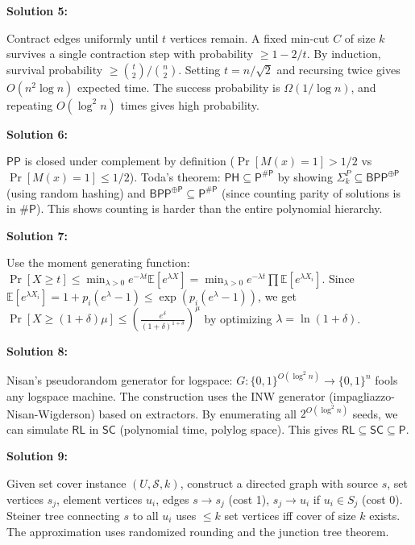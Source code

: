 \documentclass[12pt,a4paper]{exam}
\begin{document}
\textbf{Solution 5:}

Contract edges uniformly until $t$ vertices remain. A fixed min-cut $C$ of size $k$ survives a single contraction step with probability $\geq 1 - 2/t$. By induction, survival probability $\geq \binom{t}{2}/\binom{n}{2}$. Setting $t = n/\sqrt{2}$ and recursing twice gives $O(n^2 \log n)$ expected time. The success probability is $\Omega(1/\log n)$, and repeating $O(\log^2 n)$ times gives high probability.

\vspace{0.5cm}

\textbf{Solution 6:}

$\mathsf{PP}$ is closed under complement by definition ($\Pr[M(x)=1] > 1/2$ vs $\Pr[M(x)=1] \leq 1/2$). Toda's theorem: $\mathsf{PH} \subseteq \mathsf{P}^{\#\mathsf{P}}$ by showing $\Sigma_k^P \subseteq \mathsf{BPP}^{\oplus\mathsf{P}}$ (using random hashing) and $\mathsf{BPP}^{\oplus\mathsf{P}} \subseteq \mathsf{P}^{\#\mathsf{P}}$ (since counting parity of solutions is in $\#\mathsf{P}$). This shows counting is harder than the entire polynomial hierarchy.

\vspace{0.5cm}

\textbf{Solution 7:}

Use the moment generating function: $\Pr[X \geq t] \leq \min_{\lambda > 0} e^{-\lambda t} \mathbb{E}[e^{\lambda X}] = \min_{\lambda > 0} e^{-\lambda t} \prod \mathbb{E}[e^{\lambda X_i}]$. Since $\mathbb{E}[e^{\lambda X_i}] = 1 + p_i(e^\lambda - 1) \leq \exp(p_i(e^\lambda - 1))$, we get $\Pr[X \geq (1+\delta)\mu] \leq (\frac{e^\delta}{(1+\delta)^{1+\delta}})^\mu$ by optimizing $\lambda = \ln(1+\delta)$.

\vspace{0.5cm}

\textbf{Solution 8:}

Nisan's pseudorandom generator for logspace: $G: \{0,1\}^{O(\log^2 n)} \to \{0,1\}^{n}$ fools any logspace machine. The construction uses the INW generator (impagliazzo-Nisan-Wigderson) based on extractors. By enumerating all $2^{O(\log^2 n)}$ seeds, we can simulate $\mathsf{RL}$ in $\mathsf{SC}$ (polynomial time, polylog space). This gives $\mathsf{RL} \subseteq \mathsf{SC} \subseteq \mathsf{P}$.

\vspace{0.5cm}

\textbf{Solution 9:}

Given set cover instance $(U,\mathcal{S},k)$, construct a directed graph with source $s$, set vertices $s_j$, element vertices $u_i$, edges $s \to s_j$ (cost 1), $s_j \to u_i$ if $u_i \in S_j$ (cost 0). Steiner tree connecting $s$ to all $u_i$ uses $\leq k$ set vertices iff cover of size $k$ exists. The approximation uses randomized rounding and the junction tree theorem.
\end{document}
